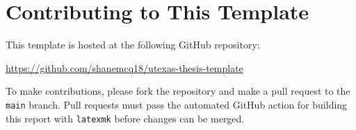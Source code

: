 \chapter{Contributing to This Template}

This template is hosted at the following GitHub repository:
\begin{center}
    \url{https://github.com/shanemcq18/utexas-thesis-template}
\end{center}
To make contributions, please fork the repository and make a pull request to the \texttt{main} branch.
Pull requests must pass the automated GitHub action for building this report with \texttt{latexmk} before changes can be merged.
